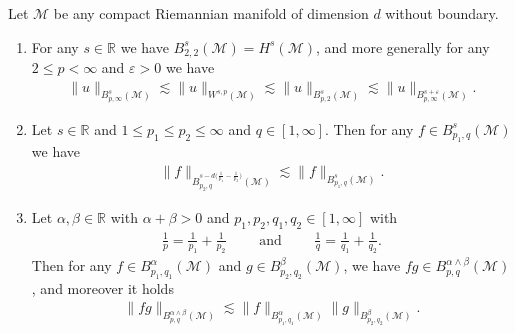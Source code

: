 \documentclass[AHL,Unicode,longabstracts,published]{cedram}
\newcommand{\R}{\mathbb{R}}
\newcommand{\M}{\mathcal{M}}
\newcommand{\eps}{\varepsilon}
\newcommand{\les}{\lesssim}
\newcommand*{\romanenumi}{\renewcommand*{\theenumi}{\roman{enumi}}}
\begin{document}
\begin{coro}\label{cor-besov}
Let $\M$ be any compact Riemannian manifold of dimension $d$ without boundary.
\begin{enumerate}\romanenumi
\item\label{coro2.7.i} For any $s\in\R$ we have $B^s_{2,2}(\M)=H^s(\M)$, and more generally for any $2\le p <\infty$ and $\eps>0$ we have
\begin{align*}
\|u\|_{B^s_{p,\infty}(\M)}\les \|u\|_{W^{s,p}(\M)}\les \|u\|_{B^s_{p,2}(\M)} \les \|u\|_{B^{s+\eps}_{p,\infty}(\M)}.
\end{align*}
\item\label{coro2.7.ii} Let $s\in\R$ and $1\leq p_1\leq p_2\leq \infty$ and $q\in [1,\infty]$. Then for any $f\in B^s_{p_1,q}(\M)$ we have
\begin{align*}
\|f\|_{B^{s-d\big(\frac1{p_1}-\frac1{p_2}\big)}_{p_2,q}(\M)}\les \|f\|_{B^s_{p_1,q}(\M)}.
\end{align*}
\item\label{coro2.7.iii} Let $\alpha,\beta\in \R$ with $\alpha+\beta>0$ and $p_1,p_2,q_1,q_2\in [1,\infty]$ with
\begin{align*}
\frac1p = \frac1{p_1}+\frac1{p_2} \qquad\text{ and }\qquad \frac1q=\frac1{q_1}+\frac1{q_2}.
\end{align*}
Then for any $f\in B^{\alpha}_{p_1,q_1}(\M)$ and $g\in B^{\beta}_{p_2,q_2}(\M)$, we have $fg \in B^{\alpha\wedge \beta}_{p,q}(\M)$, and moreover it holds
\begin{align*}
\|fg\|_{B^{\alpha\wedge\beta}_{p,q}(\M)}\les \|f\|_{B^{\alpha}_{p_1,q_1}(\M)}\|g\|_{B^{\beta}_{p_2,q_2}(\M)}.
\end{align*}
\end{enumerate}
\end{coro}
\end{document}
